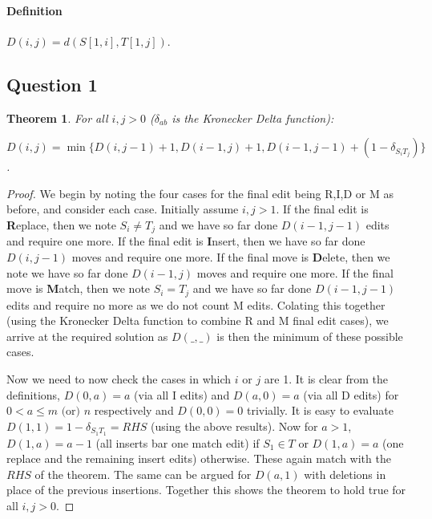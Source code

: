 \documentclass{article}
\newtheorem{theorem}{Theorem}[section]
\begin{document}
\paragraph{Definition}
$D(i,j)=d(S[1,i],T[1,j])$.
\vspace{-0.3cm}

\subsection{Question 1}
\vspace{-0.3cm}
\begin{theorem}
For all $i,j>0$ ($\delta_{ab}$ is the Kronecker Delta function):

$D(i,j) = \min \{D(i,j-1)+1, D(i-1,j)+1, D(i-1,j-1)+(1-\delta_{S_i T_j})\}$.
\end{theorem}
\vspace{-0.7cm}
\begin{proof}
We begin by noting the four cases for the final edit being R,I,D or M as before, and consider each case. Initially assume $i,j>1$. If the final edit is \textbf{R}eplace, then we note $S_i \neq T_j$ and we have so far done $D(i-1,j-1)$ edits and require one more. If the final edit is \textbf{I}nsert, then we have so far done $D(i,j-1)$ moves and require one more. If the final move is \textbf{D}elete, then we note we have so far done $D(i-1,j)$ moves and require one more. If the final move is \textbf{M}atch, then we note $S_i=T_j$ and we have so far done $D(i-1,j-1)$ edits and require no more as we do not count M edits. Colating this together (using the Kronecker Delta function to combine R and M final edit cases), we arrive at the required solution as $D(\_,\_)$ is then the minimum of these possible cases. 

Now we need to now check the cases in which $i$ or $j$ are 1. It is clear from the definitions, $D(0,a)=a$ (via all I edits) and $D(a,0)=a$ (via all D edits) for $0 < a \leq m \text{ (or) } n$ respectively and $D(0,0)=0$ trivially. It is easy to evaluate $D(1,1)=1-\delta_{S_1 T_1}=RHS$ (using the above results). Now for $a>1$, $D(1,a)=a-1$ (all inserts bar one match edit) if $S_1 \in T$ or $D(1,a)=a$ (one replace and the remaining insert edits) otherwise. These again match with the $RHS$ of the theorem. The same can be argued for $D(a,1)$ with deletions in place of the previous insertions. Together this shows the theorem to hold true for all $i,j>0$.
\end{proof}
\vspace{-0.3cm}
\end{document}
